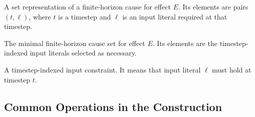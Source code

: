 \documentclass[11pt]{article}
\theoremstyle{remark}
\begin{document}
\begin{description}[leftmargin=2.8cm,style=nextline]
  \item[\(\Gamma_E\)]
  A set representation of a finite-horizon cause for effect \(E\). Its elements
  are pairs \((t,\ell)\), where \(t\) is a timestep and \(\ell\) is an input
  literal required at that timestep.

  \item[\(\Gamma_E^\star\)]
  The minimal finite-horizon cause set for effect \(E\). Its elements are
  the timestep-indexed input literals selected as necessary.

  \item[\((t,\ell)\)]
  A timestep-indexed input constraint. It means that input literal \(\ell\) must
  hold at timestep \(t\).
\end{description}

\subsection*{Common Operations in the Construction}
\end{document}
